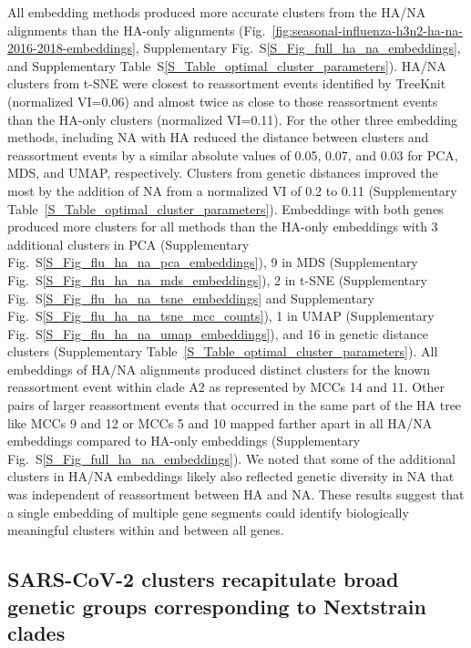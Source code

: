 \documentclass[webpdf,contemporary,large,single]{oup-authoring-template}%
\theoremstyle{thmstyleone}%
\theoremstyle{thmstyletwo}%
\theoremstyle{thmstylethree}%
\begin{document}
All embedding methods produced more accurate clusters from the HA/NA alignments than the HA-only alignments (Fig.~\ref{fig:seasonal-influenza-h3n2-ha-na-2016-2018-embeddings}, Supplementary Fig.~S\ref{S_Fig_full_ha_na_embeddings}, and Supplementary Table~S\ref{S_Table_optimal_cluster_parameters}).
HA/NA clusters from t-SNE were closest to reassortment events identified by TreeKnit (normalized VI=0.06) and almost twice as close to those reassortment events than the HA-only clusters (normalized VI=0.11).
For the other three embedding methods, including NA with HA reduced the distance between clusters and reassortment events by a similar absolute values of 0.05, 0.07, and 0.03 for PCA, MDS, and UMAP, respectively.
Clusters from genetic distances improved the most by the addition of NA from a normalized VI of 0.2 to 0.11 (Supplementary Table~\ref{S_Table_optimal_cluster_parameters}).
Embeddings with both genes produced more clusters for all methods than the HA-only embeddings with 3 additional clusters in PCA (Supplementary Fig.~S\ref{S_Fig_flu_ha_na_pca_embeddings}), 9 in MDS (Supplementary Fig.~S\ref{S_Fig_flu_ha_na_mds_embeddings}), 2 in t-SNE (Supplementary Fig.~S\ref{S_Fig_flu_ha_na_tsne_embeddings} and Supplementary Fig.~S\ref{S_Fig_flu_ha_na_tsne_mcc_counts}), 1 in UMAP (Supplementary Fig.~S\ref{S_Fig_flu_ha_na_umap_embeddings}), and 16 in genetic distance clusters (Supplementary Table~\ref{S_Table_optimal_cluster_parameters}).
All embeddings of HA/NA alignments produced distinct clusters for the known reassortment event within clade A2 \citep{Potter2019} as represented by MCCs 14 and 11.
Other pairs of larger reassortment events that occurred in the same part of the HA tree like MCCs 9 and 12 or MCCs 5 and 10 mapped farther apart in all HA/NA embeddings compared to HA-only embeddings (Supplementary Fig.~S\ref{S_Fig_full_ha_na_embeddings}).
We noted that some of the additional clusters in HA/NA embeddings likely also reflected genetic diversity in NA that was independent of reassortment between HA and NA.
These results suggest that a single embedding of multiple gene segments could identify biologically meaningful clusters within and between all genes.

\subsection{SARS-CoV-2 clusters recapitulate broad genetic groups corresponding to Nextstrain clades}
\end{document}
